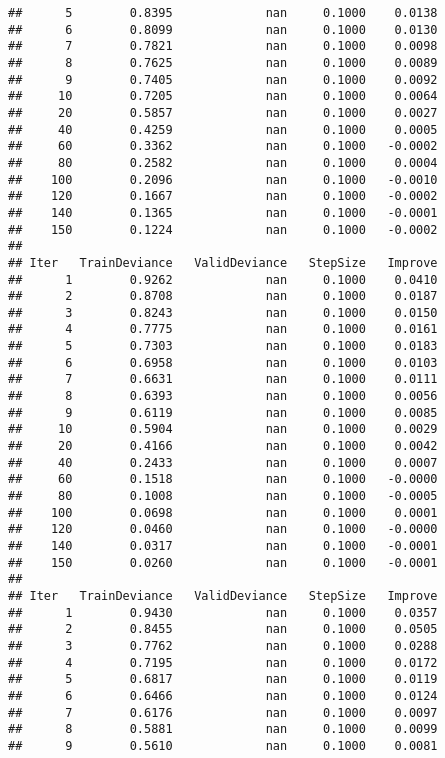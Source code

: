 \documentclass[]{article}
\begin{document}
\begin{verbatim}
##      5        0.8395             nan     0.1000    0.0138
##      6        0.8099             nan     0.1000    0.0130
##      7        0.7821             nan     0.1000    0.0098
##      8        0.7625             nan     0.1000    0.0089
##      9        0.7405             nan     0.1000    0.0092
##     10        0.7205             nan     0.1000    0.0064
##     20        0.5857             nan     0.1000    0.0027
##     40        0.4259             nan     0.1000    0.0005
##     60        0.3362             nan     0.1000   -0.0002
##     80        0.2582             nan     0.1000    0.0004
##    100        0.2096             nan     0.1000   -0.0010
##    120        0.1667             nan     0.1000   -0.0002
##    140        0.1365             nan     0.1000   -0.0001
##    150        0.1224             nan     0.1000   -0.0002
## 
## Iter   TrainDeviance   ValidDeviance   StepSize   Improve
##      1        0.9262             nan     0.1000    0.0410
##      2        0.8708             nan     0.1000    0.0187
##      3        0.8243             nan     0.1000    0.0150
##      4        0.7775             nan     0.1000    0.0161
##      5        0.7303             nan     0.1000    0.0183
##      6        0.6958             nan     0.1000    0.0103
##      7        0.6631             nan     0.1000    0.0111
##      8        0.6393             nan     0.1000    0.0056
##      9        0.6119             nan     0.1000    0.0085
##     10        0.5904             nan     0.1000    0.0029
##     20        0.4166             nan     0.1000    0.0042
##     40        0.2433             nan     0.1000    0.0007
##     60        0.1518             nan     0.1000   -0.0000
##     80        0.1008             nan     0.1000   -0.0005
##    100        0.0698             nan     0.1000    0.0001
##    120        0.0460             nan     0.1000   -0.0000
##    140        0.0317             nan     0.1000   -0.0001
##    150        0.0260             nan     0.1000   -0.0001
## 
## Iter   TrainDeviance   ValidDeviance   StepSize   Improve
##      1        0.9430             nan     0.1000    0.0357
##      2        0.8455             nan     0.1000    0.0505
##      3        0.7762             nan     0.1000    0.0288
##      4        0.7195             nan     0.1000    0.0172
##      5        0.6817             nan     0.1000    0.0119
##      6        0.6466             nan     0.1000    0.0124
##      7        0.6176             nan     0.1000    0.0097
##      8        0.5881             nan     0.1000    0.0099
##      9        0.5610             nan     0.1000    0.0081

\end{verbatim}
\end{document}

